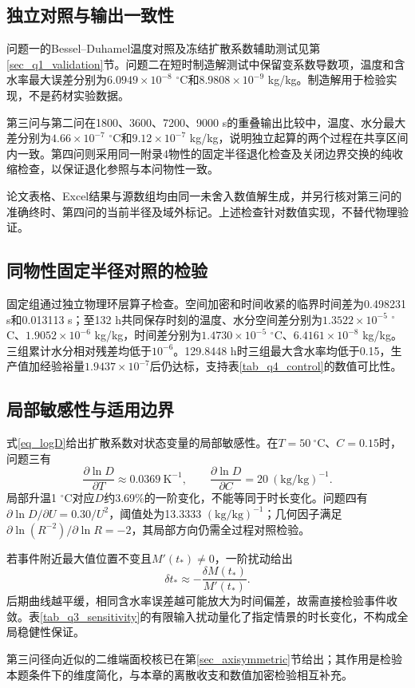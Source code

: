 \subsection{独立对照与输出一致性}
问题一的Bessel--Duhamel温度对照及冻结扩散系数辅助测试见第\ref{sec_q1_validation}节。问题二在短时制造解测试中保留变系数导数项，温度和含水率最大误差分别为$6.0949\times10^{-8}$ $^\circ$C和$8.9808\times10^{-9}$ kg/kg。制造解用于检验实现，不是药材实验数据。

第三问与第二问在1800、3600、7200、9000 s的重叠输出比较中，温度、水分最大差分别为$4.66\times10^{-7}$ $^\circ$C和$9.12\times10^{-7}$ kg/kg，说明独立起算的两个过程在共享区间内一致。第四问则采用同一附录4物性的固定半径退化检查及关闭边界交换的纯收缩检查，以保证退化参照与本问物性一致。

论文表格、Excel结果与源数组均由同一未舍入数值解生成，并另行核对第三问的准确终时、第四问的当前半径及域外标记。上述检查针对数值实现，不替代物理验证。

\subsection{同物性固定半径对照的检验}
固定组通过独立物理环层算子检查。空间加密和时间收紧的临界时间差为0.498231 s和0.013113 s；至132 h共同保存时刻的温度、水分空间差分别为$1.3522\times10^{-5}$ $^\circ$C、$1.9052\times10^{-6}$ kg/kg，时间差分别为$1.4730\times10^{-5}$ $^\circ$C、$6.4161\times10^{-8}$ kg/kg。三组累计水分相对残差均低于$10^{-6}$。129.8448 h时三组最大含水率均低于0.15，生产值加经验裕量$1.9437\times10^{-7}$后仍达标，支持表\ref{tab_q4_control}的数值可比性。

\subsection{局部敏感性与适用边界}
式\eqref{eq_logD}给出扩散系数对状态变量的局部敏感性。在$T=50\ ^\circ$C、$C=0.15$时，问题三有
\[
\frac{\partial\ln D}{\partial T}\approx0.0369\ \mathrm{K^{-1}},\qquad
\frac{\partial\ln D}{\partial C}=20\ \mathrm{(kg/kg)^{-1}}.
\]
局部升温1 $^\circ$C对应$D$约3.69\%的一阶变化，不能等同于时长变化。问题四有$\partial\ln D/\partial U=0.30/U^2$，阈值处为13.3333 $(\mathrm{kg/kg})^{-1}$；几何因子满足$\partial\ln(R^{-2})/\partial\ln R=-2$，其局部方向仍需全过程对照检验。

若事件附近最大值位置不变且$M'(t_*)\ne0$，一阶扰动给出
\begin{equation}\label{eq_event_sensitivity}
\delta t_*\approx-\frac{\delta M(t_*)}{M'(t_*)}.
\end{equation}
后期曲线越平缓，相同含水率误差越可能放大为时间偏差，故需直接检验事件收敛。表\ref{tab_q3_sensitivity}的有限输入扰动量化了指定情景的时长变化，不构成全局稳健性保证。

第三问径向近似的二维端面校核已在第\ref{sec_axisymmetric}节给出；其作用是检验本题条件下的维度简化，与本章的离散收支和数值加密检验相互补充。
\FloatBarrier
